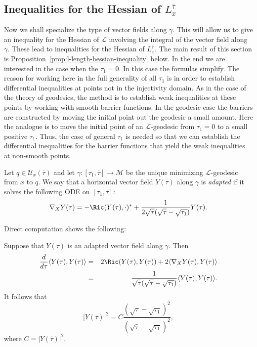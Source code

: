 \subsection{Inequalities for the Hessian of $L_x^{\bar\tau}$}

Now we shall specialize the type of vector fields along $\gamma$.
This will allow us to give an inequality for the Hessian of
${\mathcal L}$ involving the integral of the vector field along
$\gamma$. These lead to inequalities for the Hessian of
$L_x^{\bar\tau}$. The main result
of this section is Proposition~\ref{prop:l-length-hessian-inequality} below. In the end we
are interested in the case when the $\tau_1=0$. In this case the
formulas simplify. The reason for working here in the full
generality of all $\tau_1$ is in order to establish differential
inequalities at points not in the injectivity domain. As in the case
of the theory of geodesics, the method is to establish weak
inequalities at these points by working with smooth barrier
functions. In the geodesic case the barriers are constructed by
moving the initial point out the geodesic a small amount. Here the
analogue is to move the initial point of an ${\mathcal L}$-geodesic
from $\tau_1=0$ to a small positive $\tau_1$. Thus, the case of
general $\tau_1$ is needed so that we can establish the differential
inequalities for the barrier functions that yield the weak
inequalities at non-smooth points.

\begin{definition}\label{def:adapted-vector-field}
Let $q\in {\mathcal U}_x(\bar\tau)$ and let $\gamma\colon
[\tau_1,\bar\tau]\to {\mathcal M}$ be the unique minimizing
${\mathcal L}$-geodesic from $x$ to $q$. We say that a horizontal
vector field $Y(\tau)$ along $\gamma$ is {\em adapted} if it solves
the following ODE on $[\tau_1,\bar \tau]$:
\begin{equation}\label{firstYeqn}
\nabla_{X}Y(\tau) = -\Ric(Y(\tau),\cdot)^* +
\frac{1}{2\sqrt{\tau}(\sqrt{\tau}-\sqrt{\tau_1})}Y(\tau).
\end{equation}
 \end{definition}

Direct computation shows the following:

 \begin{lemma}\label{lem:adapted-vector-field-norm}
\label{adaptform}
 Suppose that $Y(\tau)$ is an adapted vector field along $\gamma$.
 Then
\begin{eqnarray}\label{secondYeqn}
\frac{d}{d\tau}\langle Y(\tau),Y(\tau)\rangle & = &
2\Ric(Y(\tau),Y(\tau)) + 2\langle \nabla_{X}Y(\tau),Y(\tau)\rangle \\
& = &  \frac{1}{\sqrt{\tau}(\sqrt{\tau}-\sqrt{\tau_1})}\langle
Y(\tau),Y(\tau)\rangle\nonumber.
\end{eqnarray} It follows that
$$|Y(\tau)|^2 = C\frac{(\sqrt{\tau}-\sqrt{\tau_1})^2}{(\sqrt{\bar\tau}-\sqrt{\tau_1})^2},$$
where $C=|Y(\bar\tau)|^2$.
\end{lemma}





